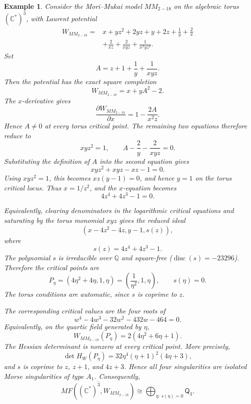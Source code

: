 \documentclass[11pt]{amsart}
\newtheorem{example}{Example}[section]
\newcommand{\MorseCat}[1]{\mathsf{Q}_{#1}}
\begin{document}
\begin{example}
Consider the Mori--Mukai model $MM_{2-18}$ on the algebraic torus
$(\mathbb{C}^*)^3$, with Laurent potential
\begin{align*}
W_{MM_{2-18}}={}&x+yz^2+2yz+y+2z+\frac{1}{y}
+\frac{2}{x} \\
&+\frac{2}{xz}+\frac{2}{xyz}+\frac{1}{x^2yz^2}.
\end{align*}
Set
\[
A=z+1+\frac{1}{y}+\frac{1}{xyz}.
\]
Then the potential has the exact square completion
\[
W_{MM_{2-18}}=x+yA^2-2.
\]
The $x$-derivative gives
\[
\frac{\partial W_{MM_{2-18}}}{\partial x}
=1-\frac{2A}{x^2z}.
\]
Hence $A\neq0$ at every torus critical point. The remaining two equations
therefore reduce to
\[
xyz^2=1,
\qquad
A-\frac{2}{y}-\frac{2}{xyz}=0.
\]
Substituting the definition of $A$ into the second equation gives
\[
xyz^2+xyz-xz-1=0.
\]
Using $xyz^2=1$, this becomes $xz(y-1)=0$, and hence $y=1$ on the
torus critical locus. Thus $x=1/z^2$, and the $x$-equation becomes
\[
4z^4+4z^3-1=0.
\]

Equivalently, clearing denominators in the logarithmic critical equations and
saturating by the torus monomial $xyz$ gives the reduced ideal
\[
\left(
x-4z^2-4z,
y-1,
s(z)
\right),
\]
where
\[
s(z)=4z^4+4z^3-1.
\]
The polynomial $s$ is irreducible over $\mathbb{Q}$ and square-free
($\operatorname{disc}(s)=-23296$). Therefore the critical points are
\[
P_{\eta}=\left(4\eta^2+4\eta,1,\eta\right)
=\left(\frac{1}{\eta^2},1,\eta\right),
\qquad
s(\eta)=0.
\]
The torus conditions are automatic, since $s$ is coprime to $z$.

The corresponding critical values are the four roots of
\[
w^4-4w^3-32w^2-432w-464=0.
\]
Equivalently, on the quartic field generated by $\eta$,
\[
W_{MM_{2-18}}(P_{\eta})=2(4\eta^2+6\eta+1).
\]
The Hessian determinant is nonzero at every critical point. More precisely,
\[
\det H_W(P_{\eta})=32\eta^4(\eta+1)^2(4\eta+3),
\]
and $s$ is coprime to $z$, $z+1$, and $4z+3$. Hence all four singularities
are isolated Morse singularities of type $A_1$. Consequently,
\[
\overline{MF((\mathbb{C}^*)^3,W_{MM_{2-18}})}
\cong \bigoplus_{\eta:\,s(\eta)=0}\MorseCat{3}.
\]
\end{example}
\end{document}
